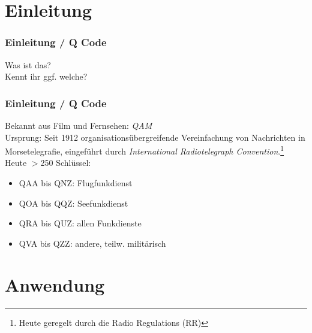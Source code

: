 

\subtitle{Betriebstechnik/Vorschriften 03: \\
          Der "Q-Schlüssel"                \\[2em]}
\date{Stand 30.10.2014}



\section*{Einleitung}

\begin{frame}
    \frametitle{Einleitung / Q Code}
    \begin{center}
        \Large{Was ist das?} \\
        \Large{Kennt ihr ggf. welche?}
    \end{center}
\end{frame}

\begin{frame}
    \frametitle{Einleitung / Q Code}

    Bekannt aus Film und Fernsehen: \emph{QAM} \\[2em]

    Ursprung: Seit 1912 organisationsübergreifende Vereinfachung von Nachrichten
    in Morsetelegrafie, eingeführt durch \emph{International Radiotelegraph
    Convention}.\footnote{\tiny Heute geregelt durch die Radio Regulations (RR)}
    \\[2em]
    
    Heute $>$250 Schlüssel:

    \begin{itemize}
        \item QAA bis QNZ: Flugfunkdienst
        \item QOA bis QQZ: Seefunkdienst
        \item QRA bis QUZ: allen Funkdienste
        \item QVA bis QZZ: andere, teilw. militärisch
    \end{itemize}

\end{frame}

\section*{Anwendung}


